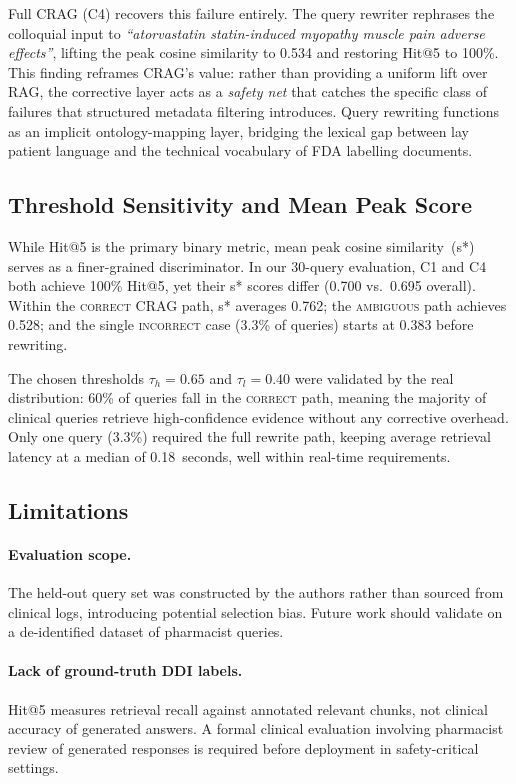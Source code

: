 \documentclass[10pt, twocolumn]{article}
\begin{document}
Full CRAG (C4) recovers this failure entirely.  The query rewriter
rephrases the colloquial input to \textit{``atorvastatin
statin-induced myopathy muscle pain adverse effects''}, lifting the
peak cosine similarity to 0.534 and restoring Hit@5 to 100\%.  This
finding reframes CRAG's value: rather than providing a uniform lift
over RAG, the corrective layer acts as a \emph{safety net} that
catches the specific class of failures that structured metadata
filtering introduces.  Query rewriting functions as an implicit
ontology-mapping layer, bridging the lexical gap between lay patient
language and the technical vocabulary of FDA labelling documents.

\subsection{Threshold Sensitivity and Mean Peak Score}

While Hit@5 is the primary binary metric, mean peak cosine
similarity~(s*) serves as a finer-grained discriminator.  In our
30-query evaluation, C1 and C4 both achieve 100\% Hit@5, yet their
s* scores differ (0.700 vs.\ 0.695 overall).  Within the
\textsc{correct} CRAG path, s* averages 0.762; the
\textsc{ambiguous} path achieves 0.528; and the single
\textsc{incorrect} case (3.3\% of queries) starts at 0.383 before
rewriting.

The chosen thresholds $\tau_h = 0.65$ and $\tau_l = 0.40$ were
validated by the real distribution: 60\% of queries fall in the
\textsc{correct} path, meaning the majority of clinical queries
retrieve high-confidence evidence without any corrective overhead.
Only one query (3.3\%) required the full rewrite path, keeping
average retrieval latency at a median of 0.18~seconds, well within
real-time requirements.

\subsection{Limitations}

\paragraph{Evaluation scope.}
The held-out query set was constructed by the authors rather than sourced
from clinical logs, introducing potential selection bias.  Future work
should validate on a de-identified dataset of pharmacist queries.

\paragraph{Lack of ground-truth DDI labels.}
Hit@5 measures retrieval recall against annotated relevant chunks, not
clinical accuracy of generated answers.  A formal clinical evaluation
involving pharmacist review of generated responses is required before
deployment in safety-critical settings.
\end{document}
